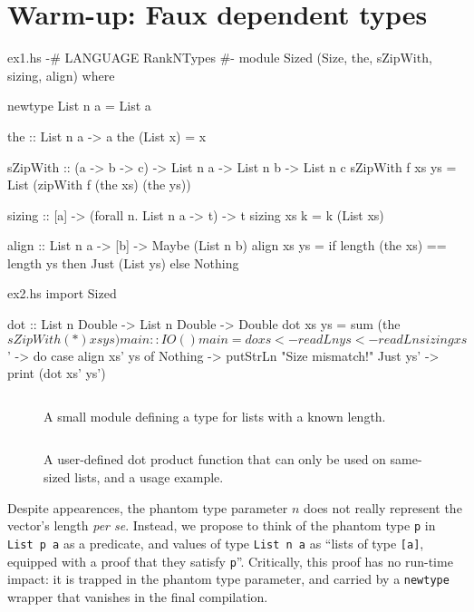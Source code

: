 \documentclass[format=sigplan, review=false, screen=true]{acmart}
\begin{document}
\section{Warm-up: Faux dependent types}

\begin{filecontents*}{ex1.hs}  
{-# LANGUAGE RankNTypes #-}
module Sized
  (Size, the, sZipWith, sizing, align) where

newtype List n a = List a

the :: List n a -> a
the (List x) = x

sZipWith :: (a -> b -> c)
         -> List n a
         -> List n b
         -> List n c
sZipWith f xs ys =
  List (zipWith f (the xs) (the ys))
  
sizing :: [a] -> (forall n. List n a -> t) -> t
sizing xs k = k (List xs)

align :: List n a -> [b] -> Maybe (List n b)
align xs ys = if length (the xs) == length ys
              then Just (List ys)
              else Nothing

\end{filecontents*}

\begin{filecontents*}{ex2.hs}
import Sized

dot :: List n Double -> List n Double -> Double
dot xs ys = sum (the $ sZipWith (*) xs ys)

main :: IO ()
main = do
  xs <- readLn
  ys <- readLn
  sizing xs $ \xs' -> do
    case align xs' ys of
      Nothing  -> putStrLn "Size mismatch!"
      Just ys' -> print (dot xs' ys')
\end{filecontents*}

\begin{figure}
    \inputminted{haskell}{ex1.hs}
  \caption{A small module defining a type for lists with a known length.}
\end{figure}
\begin{figure}
    \inputminted{haskell}{ex2.hs}
    \caption{A user-defined dot product function that can only be used on same-sized lists,
    and a usage example. \label{dot-product}}
\end{figure}

Despite  appearences, the phantom type parameter $n$ does not really represent the vector's length
{\em per se}. Instead, we propose to think of the phantom type \texttt{p} in \texttt{List p a} as a predicate,
and values of type \texttt{List n a} as ``lists of type \texttt{[a]}, equipped with a proof
that they satisfy \texttt{p}''. Critically, this proof has no run-time impact: it is trapped in the
phantom type parameter, and carried by a \texttt{newtype} wrapper that vanishes in
the final compilation.
\end{document}
